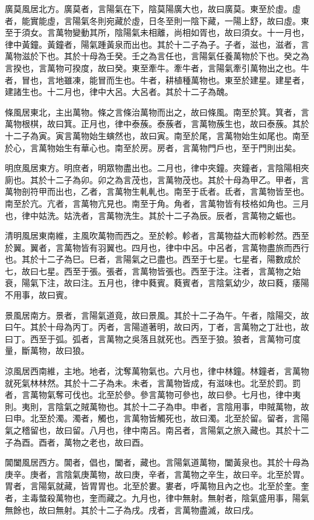 廣莫風居北方。廣莫者，言陽氣在下，陰莫陽廣大也，故曰廣莫。東至於虛。虛者，能實能虛，言陽氣冬則宛藏於虛，日冬至則一陰下藏，一陽上舒，故曰虛。東至于須女。言萬物變動其所，陰陽氣未相離，尚相如胥也，故曰須女。十一月也，律中黃鐘。黃鐘者，陽氣踵黃泉而出也。其於十二子為子。子者，滋也，滋者，言萬物滋於下也。其於十母為壬癸。壬之為言任也，言陽氣任養萬物於下也。癸之為言揆也，言萬物可揆度，故曰癸。東至牽牛。牽牛者，言陽氣牽引萬物出之也。牛者，冒也，言地雖凍，能冒而生也。牛者，耕植種萬物也。東至於建星。建星者，建諸生也。十二月也，律中大呂。大呂者。其於十二子為醜。

條風居東北，主出萬物。條之言條治萬物而出之，故曰條風。南至於箕。箕者，言萬物根棋，故曰箕。正月也，律中泰蔟。泰蔟者，言萬物蔟生也，故曰泰蔟。其於十二子為寅。寅言萬物始生螾然也，故曰寅。南至於尾，言萬物始生如尾也。南至於心，言萬物始生有華心也。南至於房。房者，言萬物門戶也，至于門則出矣。

明庶風居東方。明庶者，明眾物盡出也。二月也，律中夾鐘。夾鐘者，言陰陽相夾廁也。其於十二子為卯。卯之為言茂也，言萬物茂也。其於十母為甲乙。甲者，言萬物剖符甲而出也，乙者，言萬物生軋軋也。南至于氐者。氐者，言萬物皆至也。南至於亢。亢者，言萬物亢見也。南至于角。角者，言萬物皆有枝格如角也。三月也，律中姑洗。姑洗者，言萬物洗生。其於十二子為辰。辰者，言萬物之蜄也。

清明風居東南維，主風吹萬物而西之。至於軫。軫者，言萬物益大而軫軫然。西至於翼。翼者，言萬物皆有羽翼也。四月也，律中中呂。中呂者，言萬物盡旅而西行也。其於十二子為巳。巳者，言陽氣之已盡也。西至于七星。七星者，陽數成於七，故曰七星。西至于張。張者，言萬物皆張也。西至于注。注者，言萬物之始衰，陽氣下注，故曰注。五月也，律中蕤賓。蕤賓者，言陰氣幼少，故曰蕤，痿陽不用事，故曰賓。

景風居南方。景者，言陽氣道竟，故曰景風。其於十二子為午。午者，陰陽交，故曰午。其於十母為丙丁。丙者，言陽道著明，故曰丙，丁者，言萬物之丁壯也，故曰丁。西至于弧。弧者，言萬物之吳落且就死也。西至于狼。狼者，言萬物可度量，斷萬物，故曰狼。

涼風居西南維，主地。地者，沈奪萬物氣也。六月也，律中林鐘。林鐘者，言萬物就死氣林林然。其於十二子為未。未者，言萬物皆成，有滋味也。北至於罰。罰者，言萬物氣奪可伐也。北至於參。參言萬物可參也，故曰參。七月也，律中夷則。夷則，言陰氣之賊萬物也。其於十二子為申。申者，言陰用事，申賊萬物，故曰申。北至於濁。濁者，觸也，言萬物皆觸死也，故曰濁。北至於留。留者，言陽氣之稽留也，故曰留。八月也，律中南呂。南呂者，言陽氣之旅入藏也。其於十二子為酉。酉者，萬物之老也，故曰酉。

閶闔風居西方。閶者，倡也，闔者，藏也。言陽氣道萬物，闔黃泉也。其於十母為庚辛。庚者，言陰氣庚萬物，故曰庚，辛者，言萬物之辛生，故曰辛。北至於胃。胃者，言陽氣就藏，皆胃胃也。北至於婁。婁者，呼萬物且內之也。北至於奎。奎者，主毒螫殺萬物也，奎而藏之。九月也，律中無射。無射者，陰氣盛用事，陽氣無餘也，故曰無射。其於十二子為戌。戌者，言萬物盡滅，故曰戌。

